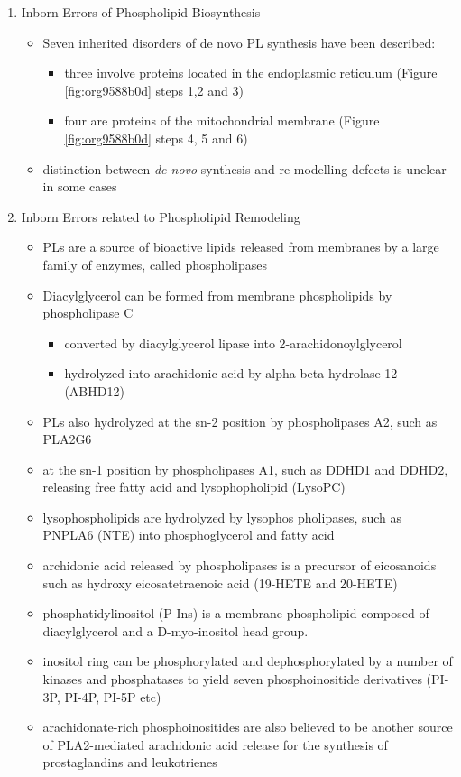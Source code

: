 \documentclass{scrartcl}
\begin{document}
\begin{enumerate}
\item Inborn Errors of Phospholipid Biosynthesis
\label{sec:org1e0b3e3}
\begin{itemize}
\item Seven inherited disorders of de novo PL synthesis have been described:
\begin{itemize}
\item three involve proteins located in the endoplasmic reticulum
(Figure \ref{fig:org9588b0d} steps 1,2 and 3)
\item four are proteins of the mitochondrial membrane (Figure
\ref{fig:org9588b0d} steps 4, 5 and 6)
\end{itemize}
\item distinction between \emph{de novo} synthesis and re-modelling defects is
unclear in some cases
\end{itemize}

\item Inborn Errors related to Phospholipid Remodeling
\label{sec:org3e4cb02}
\begin{itemize}
\item PLs are a source of bioactive lipids released from
membranes by a large family of enzymes, called phospholipases
\item Diacylglycerol can be formed from membrane phospholipids by
phospholipase C
\begin{itemize}
\item converted by diacylglycerol lipase into 2-arachidonoylglycerol
\item hydrolyzed into arachidonic acid by alpha beta hydrolase 12 (ABHD12)
\end{itemize}
\item PLs also hydrolyzed at the sn-2 position by phospholipases A2, such
as PLA2G6
\item at the sn-1 position by phospholipases A1, such as DDHD1 and DDHD2,
releasing free fatty acid and lysophopholipid
(LysoPC)
\item lysophospholipids are hydrolyzed by lysophos pholipases, such as
PNPLA6 (NTE) into phosphoglycerol and fatty acid
\item archidonic acid released by phospholipases is a precursor of eicosanoids such as
hydroxy eicosatetraenoic acid (19-HETE and 20-HETE)
\item phosphatidylinositol (P-Ins) is a membrane phospholipid composed of
diacylglycerol and a D-myo-inositol head group.
\item inositol ring can be phosphorylated and dephosphorylated by a number
of kinases and phosphatases to yield seven phosphoinositide
derivatives (PI-3P, PI-4P, PI-5P etc)
\item arachidonate-rich phosphoinositides are also believed to be another
source of PLA2-mediated arachidonic acid release for the synthesis
of prostaglandins and leukotrienes
\end{itemize}
\end{enumerate}
\end{document}
